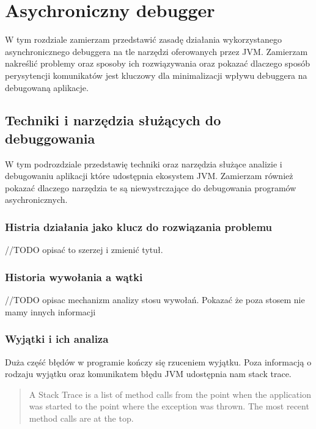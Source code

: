 \chapter{Asychroniczny debugger}

W tym rozdziale zamierzam przedstawić zasadę działania wykorzystanego asynchronicznego debuggera na tle narzędzi oferowanych przez JVM. Zamierzam nakreślić problemy oraz sposoby ich rozwiązywania oraz pokazać dlaczego sposób perysytencji komunikatów jest kluczowy dla minimalizacji wpływu debuggera na debugowaną aplikacje. 


\section{Techniki i narzędzia służących do debuggowania}

W tym podrozdziale przedstawię techniki oraz narzędzia służące analizie i debugowaniu aplikacji które udostępnia ekosystem JVM. Zamierzam również pokazać dlaczego narzędzia te są niewystrczające do debugowania programów asychronicznych.

\subsection{Histria działania jako klucz do rozwiązania problemu}

//TODO opisać to szerzej i zmienić tytuł.

\subsection{Historia wywołania a wątki}

//TODO opisac mechanizm analizy stosu wywołań. Pokazać że poza stosem nie mamy innych informacji

\subsection{Wyjątki i ich analiza}
Duża część błędów w programie kończy się rzuceniem wyjątku. Poza informacją o rodzaju wyjątku oraz komunikatem błędu JVM udostępnia nam stack trace.

\begin{quote}
A Stack Trace is a list of method calls from the point when the application was started to the point where the exception was thrown. The most recent method calls are at the top.~\cite{javaProgramming}
\end{quote} 


